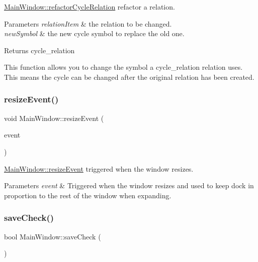 \mbox{\hyperlink{class_main_window_a9fe708c683a2dd952ccb72e04cf4a62d}{Main\+Window\+::refactor\+Cycle\+Relation}} refactor a relation. 


\begin{DoxyParams}{Parameters}
{\em relation\+Item} & the relation to be changed. \\
\hline
{\em new\+Symbol} & the new cycle symbol to replace the old one. \\
\hline
\end{DoxyParams}
\begin{DoxyReturn}{Returns}
cycle\+\_\+relation
\end{DoxyReturn}
This function allows you to change the symbol a cycle\+\_\+relation relation uses. This means the cycle can be changed after the original relation has been created. \mbox{\label{class_main_window_ae12f8f63791595567b6250f8bb002bda}} 
\subsubsection{\texorpdfstring{resize\+Event()}{resizeEvent()}}
{\footnotesize\ttfamily void Main\+Window\+::resize\+Event (\begin{DoxyParamCaption}\item[{Q\+Resize\+Event $\ast$}]{event }\end{DoxyParamCaption})}



\mbox{\hyperlink{class_main_window_ae12f8f63791595567b6250f8bb002bda}{Main\+Window\+::resize\+Event}} triggered when the window resizes. 


\begin{DoxyParams}{Parameters}
{\em event} & Triggered when the window resizes and used to keep dock in proportion to the rest of the window when expanding. \\
\hline
\end{DoxyParams}
\mbox{\label{class_main_window_ae2defb68c51e884b7031693b20bdd556}} 
\subsubsection{\texorpdfstring{save\+Check()}{saveCheck()}}
{\footnotesize\ttfamily bool Main\+Window\+::save\+Check (\begin{DoxyParamCaption}{ }\end{DoxyParamCaption})}




